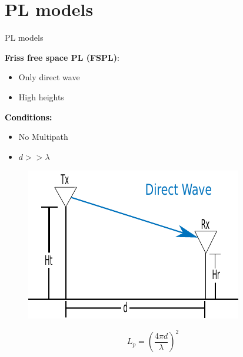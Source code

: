 \documentclass[10pt]{beamer}
\begin{document}
\section{PL models}
\begin{frame}{PL models}
\begin{minipage}{.45\textwidth}
\raggedright\textcolor{thomasblue}{\textbf{Friss free space PL (FSPL)}:}
\begin{itemize}
\item Only direct wave
\item High heights
\end{itemize} 

\vspace{1em}
\textcolor{black}{\textbf{Conditions:}}
\begin{itemize}
\item No Multipath
\item $d >> \lambda$
\end{itemize}
\end{minipage}
\begin{minipage}{0.5\textwidth}

\begin{figure}[!htbp]
 \centering
  \includegraphics[width = \columnwidth]{figures/friss_illu.pdf}
  \end{figure}
\end{minipage}

\vspace{1em}
\begin{equation*}
L_p=\left(\frac{4 \pi d}{\lambda}\right)^2
\end{equation*}
\end{frame}
\end{document}
